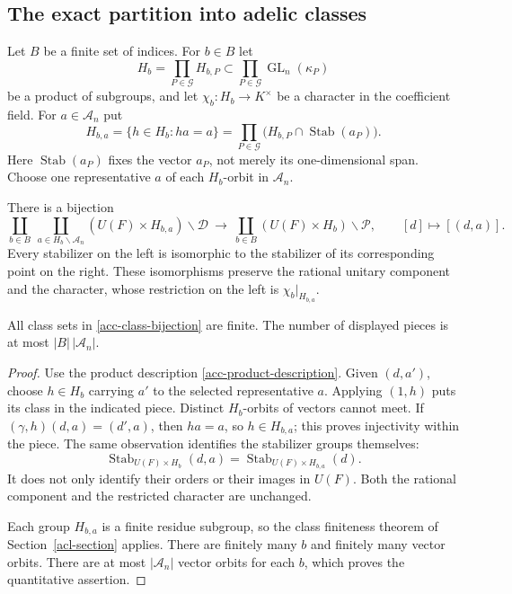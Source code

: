 \subsection{The exact partition into adelic classes}

Let $B$ be a finite set of indices.  For $b\in B$ let
\[
 H_b=\prod_{P\in\mathcal G}H_{b,P}
      \subset\prod_{P\in\mathcal G}\operatorname{GL}_n(\kappa_P)
\]
be a product of subgroups, and let $\chi_b:H_b\to K^\times$
be a character in the coefficient field.  For $a\in\mathcal A_n$
put
\begin{equation}\label{acc-stabilizer-level}
 H_{b,a}=\{h\in H_b:ha=a\}
      =\prod_{P\in\mathcal G}
            \bigl(H_{b,P}\cap\operatorname{Stab}(a_P)\bigr).
\end{equation}
Here $\operatorname{Stab}(a_P)$ fixes the vector $a_P$, not merely
its one-dimensional span.  Choose one representative $a$ of each
$H_b$-orbit in $\mathcal A_n$.

\begin{theorem}\label{acc-class-partition}
There is a bijection
\begin{equation}\label{acc-class-bijection}
 \coprod_{b\in B}\ \coprod_{a\in H_b\backslash\mathcal A_n}
       (U(F)\times H_{b,a})\backslash\mathscr D
 \ \longrightarrow\
 \coprod_{b\in B}(U(F)\times H_b)\backslash\mathscr P,
 \qquad [d]\longmapsto[(d,a)].
\end{equation}
Every stabilizer on the left is isomorphic to the stabilizer of
its corresponding point on the right.  These isomorphisms preserve
the rational unitary component and the character, whose restriction
on the left is $\chi_b|_{H_{b,a}}$.

All class sets in \eqref{acc-class-bijection} are finite.
The number of displayed pieces is at most
$|B|\,|\mathcal A_n|$.
\end{theorem}

\begin{proof}
Use the product description \eqref{acc-product-description}.
Given $(d,a')$, choose $h\in H_b$ carrying $a'$ to the selected
representative $a$.  Applying $(1,h)$ puts its class in the indicated
piece.  Distinct $H_b$-orbits of vectors cannot meet.
If $(\gamma,h)(d,a)=(d',a)$, then $ha=a$, so
$h\in H_{b,a}$; this proves injectivity within the piece.
The same observation identifies the stabilizer groups themselves:
\[
 \operatorname{Stab}_{U(F)\times H_b}(d,a)
       =\operatorname{Stab}_{U(F)\times H_{b,a}}(d).
\]
It does not only identify their orders or their images in $U(F)$.
Both the rational component and the restricted character are unchanged.

Each group $H_{b,a}$ is a finite residue subgroup, so the class
finiteness theorem of Section~\ref{acl-section} applies.
There are finitely many $b$ and finitely many vector orbits.
There are at most $|\mathcal A_n|$ vector orbits for each $b$,
which proves the quantitative assertion.
\end{proof}

